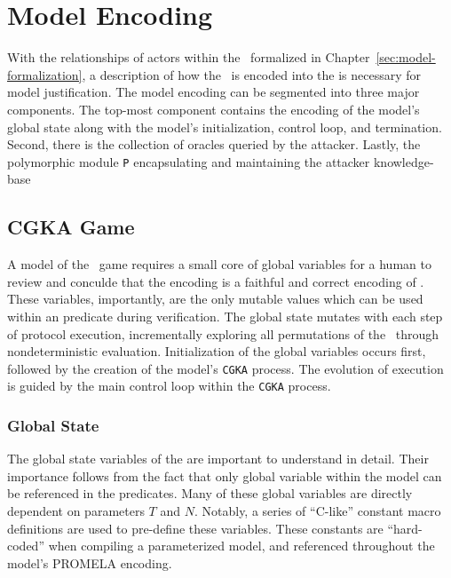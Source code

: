 \hypertarget{sec:model-encoding}{%
\chapter{Model Encoding}\label{sec:model-encoding}}

With the relationships of actors within the \CGKAsec\ formalized in Chapter\ \ref{sec:model-formalization}, a description of how the \CGKAsec\ is encoded into the  is necessary for model justification.
The  model encoding can be segmented into three major components.
The top-most component contains the encoding of the model's global state along with the model's initialization, control loop, and termination.
Second, there is the collection of oracles queried by the attacker.
Lastly, the polymorphic module \texttt{P} encapsulating and maintaining the attacker knowledge-base


\hypertarget{sec:CGKA-game-encoding}{%
\section{CGKA Game}\label{sec:CGKA-game-encoding}}

A model of the \CGKAsec\ game requires a small core of global variables for a human to review and conculde that the encoding is a faithful and correct encoding of \CGKAsec.
These variables, importantly, are the only mutable values which can be used within an  predicate during verification.
The global state mutates with each step of protocol execution, incrementally exploring all permutations of the \CGKAsec\ through nondeterministic evaluation.
Initialization of the global variables occurs first, followed by the creation of the model's \texttt{CGKA} process.
The evolution of execution is guided by the main control loop within the \texttt{CGKA} process.


\hypertarget{subsec:global-state}{%
\subsection{Global State}\label{subsec:global-state}}

The global state variables of the  are important to understand in detail.
Their importance follows from the fact that only global variable within the  model can be referenced in the  predicates.
Many of these global variables are directly dependent on parameters \(T\) and \(N\).
Notably, a series of ``C-like'' constant macro definitions are used to pre-define these variables.
These constants are ``hard-coded'' when compiling a parameterized model, and referenced throughout the model's PROMELA encoding.

